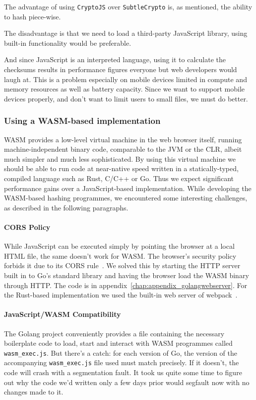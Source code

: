 The advantage of using \texttt{CryptoJS} over \texttt{SubtleCrypto} is, as mentioned, the ability to hash piece-wise.

The disadvantage is that we need to load a third-party JavaScript library, using built-in functionality would be preferable.

And since JavaScript is an interpreted language, using it to calculate the checksums results in performance figures everyone but web developers would laugh at.
This is a problem especially on mobile devices limited in compute and memory resources as well as battery capacity.
Since we want to support mobile devices properly, and don't want to limit users to small files, we must do better.

\subsubsection{Using a WASM-based implementation}
\label{subsec:wasmhashing}
\gls{WASM} provides a low-level virtual machine in the web browser itself,
running machine-independent binary code, comparable to the \gls{JVM} or the \gls{CLR},
albeit much simpler and much less sophisticated.
By using this virtual machine we should be able to run code at near-native speed written in a statically-typed, compiled language such as Rust, C/C++ or Go.
Thus we expect significant performance gains over a JavaScript-based implementation.
While developing the \gls{WASM}-based hashing programmes, we encountered some interesting challenges, as described in the following paragraphs.

\paragraph{CORS Policy} While JavaScript can be executed simply by pointing the browser at a local \gls{HTML} file, the same doesn't work for \gls{WASM}.
The browser's security policy forbids it due to its \gls{CORS} rule~\cite{cors}.
We solved this by starting the \gls{HTTP} server built in to Go's standard library and having the browser load the \gls{WASM} binary through \gls{HTTP}.
The code is in appendix~\ref{chap:appendix_golangwebserver}.
For the Rust-based implementation we used the built-in web server of webpack~\cite{webpack}.

\paragraph{JavaScript/WASM Compatibility} The Golang project conveniently provides a file containing the necessary boilerplate code to load, start and interact with \gls{WASM} programmes called \texttt{wasm\_exec.js}.
But there's a catch: for each version of Go, the version of the accompanying \texttt{wasm\_exec.js} file used must match precisely.
If it doesn't, the code will crash with a segmentation fault.
It took us quite some time to figure out why the code we'd written only a few days prior would segfault now with no changes made to it.

